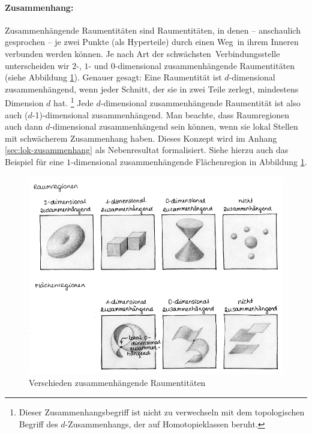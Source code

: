     \paragraph{Zusammenhang:}
        Zusammenhängende
        Raumentitäten sind Raumentitäten, in denen -- anschaulich gesprochen -- je zwei Punkte (als Hyperteile) durch einen \glqq Weg\grqq\ in ihrem Inneren verbunden werden können.
        Je nach Art der \glqq schwächsten\grqq\ Verbindungsstelle unterscheiden wir $2$-, $1$- und $0$-dimensional zusammenhängende Raumentitäten (siehe Abbildung \ref{fig:zusammenhang}).
        Genauer gesagt: Eine Raumentität ist $d$-dimensional zusammenhängend, wenn jeder Schnitt, der sie in zwei Teile zerlegt, mindestens Dimension $d$ hat.%
        \footnote{
            Dieser Zusammenhangsbegriff ist nicht zu verwechseln mit dem topologischen Begriff des $d$-Zusammenhangs, der auf Homotopieklassen beruht.
        }
        Jede $d$-dimensional zusammenhängende Raumentität ist also auch ($d$-1)-dimensional zusammenhängend.
        Man beachte, dass Raumregionen auch dann $d$-dimensional zusammenhängend sein können, wenn sie lokal Stellen mit schwächerem Zusammenhang haben. Dieses Konzept wird im Anhang \ref{sec:lok-zusammenhang} als Nebenresultat formalisiert. Siehe hierzu auch das Beispiel für eine $1$-dimensional zusammenhängende Flächenregion in Abbildung \ref{fig:zusammenhang}.

        \begin{figure}[ht]
            \centering
            \includegraphics[width=\textwidth]{abb/zusammenhang_2.png}
            \caption{Verschieden zusammenhängende Raumentitäten}
            \label{fig:zusammenhang}
        \end{figure}
    
